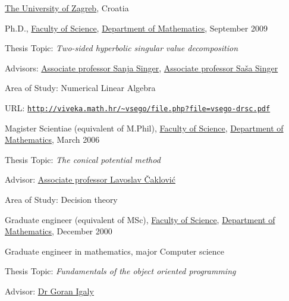 \documentclass[10pt]{article}
\makeatletter
\def\adjustpenalty{\@beginparpenalty\@M \@itempenalty\@M}
\makeatother
\begin{document}
\href{http://www.unizg.hr/}{The University of Zagreb}, Croatia
\begin{outerlist}\adjustpenalty

\item[] Ph.D.,
        \href{http://www.pmf.unizg.hr/}{Faculty of Science}, \href{http://www.math.pmf.unizg.hr/}{Department of Mathematics}, September 2009
        \begin{innerlist}
        \item Thesis Topic: \emph{Two-sided hyperbolic singular value decomposition}
        \item Advisors: \href{http://www.fsb.unizg.hr/mat-4/}{Associate professor Sanja Singer}, \href{http://www.math.pmf.unizg.hr/Default.aspx?art=2404}{Associate professor Saša Singer}
        \item Area of Study: Numerical Linear Algebra
        \item URL: {\tt\href{http://viveka.math.hr/~vsego/file.php?file=vsego-drsc.pdf}{http://viveka.math.hr/\textasciitilde{}vsego/file.php?file=vsego-drsc.pdf}}
        \end{innerlist}

\item[] Magister Scientiae (equivalent of M.Phil),
        \href{http://www.pmf.unizg.hr/}{Faculty of Science}, \href{http://www.math.pmf.unizg.hr/}{Department of Mathematics}, March 2006
        \begin{innerlist}
        \item Thesis Topic: \emph{The conical potential method}
        \item Advisor: \href{http://www.math.pmf.unizg.hr/Default.aspx?art=2355}{Associate professor Lavoslav Čaklović}
        \item Area of Study: Decision theory
        \end{innerlist}

\item[] Graduate engineer (equivalent of MSc),
        \href{http://www.pmf.unizg.hr/}{Faculty of Science}, \href{http://www.math.pmf.unizg.hr/}{Department of Mathematics}, December 2000
        \begin{innerlist}
        \item Graduate engineer in mathematics, major Computer science
        \item Thesis Topic: \emph{Fundamentals of the object oriented programming}
        \item Advisor: \href{http://www.math.pmf.unizg.hr/Default.aspx?art=2424}{Dr Goran Igaly}
        \end{innerlist}

\end{outerlist}
\end{document}
